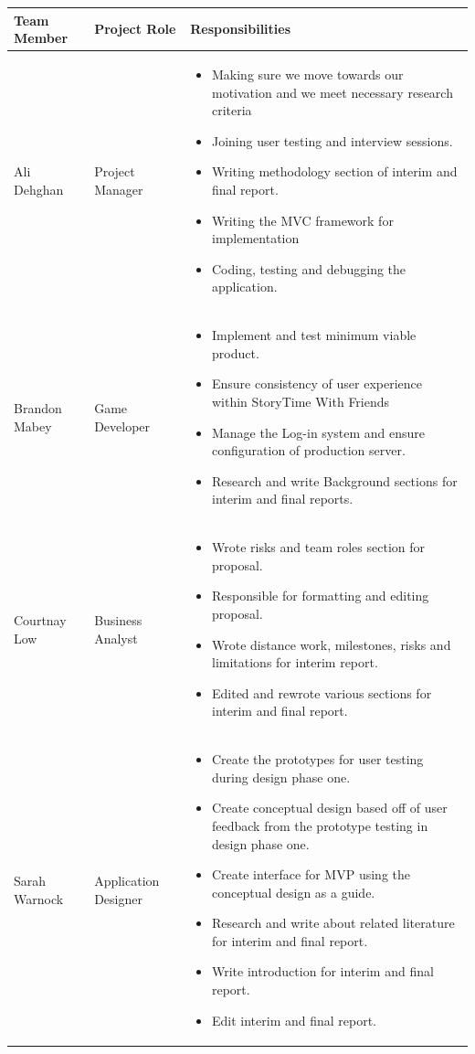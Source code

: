 \documentclass{sigchi}
\begin{document}
\begin{table}[h!]
\centering
\begin{tabular}{>{\raggedright}p{4cm}|>{\raggedright}p{4cm}|>{\raggedright}p{6cm}}

\textbf{Team Member} &
\textbf{Project Role} &
\textbf{Responsibilities} \tabularnewline \hline \hline

Ali Dehghan &
Project Manager &
\begin{itemize}[leftmargin=.15in, nosep]
\item Making sure we move towards our motivation and we meet necessary research criteria
\item Joining user testing and interview sessions.
\item Writing methodology section of interim and final report.
\item Writing the MVC framework for implementation
\item Coding, testing and debugging the application.
\end{itemize} \tabularnewline \hline

Brandon Mabey &
Game Developer &
\begin{itemize}[leftmargin=.15in, nosep]
\item Implement and test minimum viable product.
\item Ensure consistency of user experience within StoryTime With Friends
\item Manage the Log-in system and ensure configuration of production server.
\item Research and write Background sections for interim and final reports.
\end{itemize} \tabularnewline \hline

Courtnay Low &
Business Analyst &
\begin{itemize}[leftmargin=.15in, nosep]
\item Wrote risks and team roles section for proposal.
\item Responsible for formatting and editing proposal.
\item Wrote distance work, milestones, risks and limitations for interim report.
\item Edited and rewrote various sections for interim and final report.
\end{itemize}\tabularnewline \hline

Sarah Warnock &
Application Designer &
\begin{itemize}[leftmargin=.15in, nosep]
\item Create the prototypes for user testing during design phase one.
\item Create conceptual design based off of user feedback from the prototype testing in design phase one.
\item Create interface for MVP using the conceptual design as a guide.
\item Research and write about related literature for interim and final report.
\item Write introduction for interim and final report.
\item Edit interim and final report.
\end{itemize} \tabularnewline \hline


\end{tabular}
\end{table}
\end{document}
